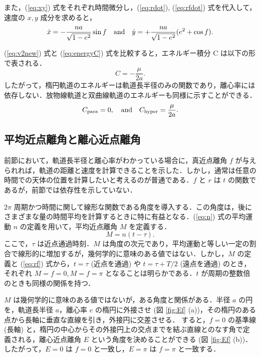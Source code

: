 \documentclass[11pt,a4paper,oneside,onecolumn]{jarticle}
\begin{document}
また，(\ref{eq:xy}) 式をそれぞれ時間微分し，(\ref{eq:rdot}),  (\ref{eq:rfdot}) 式を代入して，速度の $x, y$ 成分を求めると，
\begin{equation}
\dot{x} = - \frac{n a}{\sqrt{1 - e^2}} \sin f \quad {\rm and} \quad  \dot{y} = + \frac{n a}{\sqrt{1 - e^2}} (e^2 + \cos f). \label{eq:xdotydot}
\end{equation}

(\ref{eq:v2new}) 式と (\ref{eq:energyC}) 式を比較すると，エネルギー積分 C は以下の形で表される．
\begin{equation}
C = - \frac{\mu}{2 a}. \label{eq:C}
\end{equation}
したがって，楕円軌道のエネルギーは軌道長半径のみの関数であり，離心率には依存しない．放物線軌道と双曲線軌道のエネルギーも同様に示すことができる．
\begin{equation}
C_{{\rm para}} = 0, \quad {\rm and} \quad C_{{\rm hyper}} = \frac{\mu}{2 a}.
\end{equation}

\subsection{平均近点離角と離心近点離角}
前節において，軌道長半径と離心率がわかっている場合に，真近点離角 $f$ が与えられれば，軌道の距離と速度を計算できることを示した．しかし，通常は任意の時間での天体の位置を計算したいと考えるのが普通である．$f$ と $r$ は $t$ の関数であるが，前節では依存性を示していない．

$2 \pi$ 周期かつ時間に関して線形な関数である角度を導入する．この角度は，後にさまざまな量の時間平均を計算するときに特に有益となる．(\ref{eq:n}) 式の平均運動 $n$ の定義を用いて，平均近点離角 $M$ を定義する．
\begin{equation}
M = n (t - \tau). \label{eq:M}
\end{equation}
ここで，$\tau$ は近点通過時刻．$M$ は角度の次元であり，平均運動と等しい一定の割合で線形的に増加するが，幾何学的に意味のある値ではない．しかし，$M$ の定義と (\ref{eq:rf}) 式から，$t = \tau$ (近点を通過) や $t = \tau + T / 2$ (遠点を通過) のとき，それぞれ $M = f =0, M = f = \pi$ となることは明らかである．$t$ が周期の整数倍のときも同様の関係を持つ．

$M$ は幾何学的に意味のある値ではないが，ある角度と関係がある．半径 $a$ の円を，軌道長半径 $a$，離心率 $e$ の楕円に外接させ (図 \ref{fig:Ef} (a))，その楕円のある点から長軸に垂直な直線を引き，外接円に交差させる． すると，$f = 0$ の基準線 (長軸) と，楕円の中心からその外接円上の交点までを結ぶ直線とのなす角で定義される，離心近点離角 $E$ という角度を決めることができる (図 \ref{fig:Ef} (b))．したがって，$E = 0$ は $f = 0$ と一致し，$E = \pi$ は $f = \pi$ と一致する．
\end{document}
